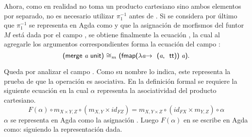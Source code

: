 Ahora, como en realidad  no toma un producto cartesiano sino ambos elementos por separado, no es necesario utilizar $\pi_1^{-1}$ antes de . Si se considera por último que $\pi_1^{-1}$ se representa en Agda como \AgdaSymbol{($\lambda$}  \AgdaSymbol{$\rightarrow$ \ (} \AgdaSymbol{))} y que la asignación de morfismos del funtor $\mathit{M}$ está dada por el campo , se obtiene finalmente la ecuación    \AgdaSymbol{($\lambda$}  \AgdaSymbol{$\rightarrow$ \ (} \AgdaSymbol{))}, la cual al agregarle los argumentos correspondientes forma la ecuación del campo :  
\begin{equation*}
\AgdaSymbol{(}\AgdaField{merge} \ \AgdaBound{a} \ \AgdaField{unit}\AgdaSymbol{)} \   \AgdaField{$\cong_m$} \ \AgdaSymbol{(}\AgdaField{fmap} \AgdaSymbol{($\lambda$} \AgdaBound{a} \AgdaSymbol{$\rightarrow$ \ (}\AgdaBound{a} \AgdaInductiveConstructor{, \ tt} \AgdaSymbol{))} \ \AgdaBound{a}\AgdaSymbol{)}.
\end{equation*}

Queda por analizar el campo . Como su nombre lo indica, este representa la prueba de que la operación  es asociativa. En la definición formal se requiere la siguiente ecuación en la cual $\alpha$ representa la asociatividad del producto cartesiano.
\begin{equation*}
\mathit{F}(\alpha) \circ m_{X \times Y, Z} \circ (m_{X,Y} \times id_{\mathit{F}Z}) = m_{X, Y \times Z} \circ (id_{\mathit{F}X} \times m_{Y,Z}) \circ \alpha
\end{equation*}
$\alpha$ se representa en Agda como la asignación \AgdaSymbol{($\lambda \{$((} \AgdaInductiveConstructor{,} \AgdaSymbol{)} \AgdaInductiveConstructor{,} \AgdaSymbol{) $\rightarrow$ (} \AgdaInductiveConstructor{,} \AgdaSymbol{(} \AgdaInductiveConstructor{,} \AgdaSymbol{))\})}. Luego $\mathit{F}(\alpha)$ en se escribe en Agda como: 
\AgdaSymbol{(} \AgdaSymbol{($\lambda \{$((} \AgdaInductiveConstructor{,} \AgdaSymbol{)} \AgdaInductiveConstructor{,} \AgdaSymbol{) $\rightarrow$ (} \AgdaInductiveConstructor{,} \AgdaSymbol{(} \AgdaInductiveConstructor{,} \AgdaSymbol{))\}))} siguiendo la representación dada.

